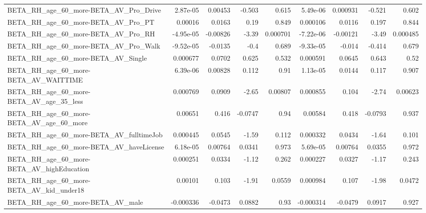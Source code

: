 \begin{tabular}{lrrrrrrrr}
BETA\_RH\_age\_60\_more-BETA\_AV\_Pro\_Drive              &    2.87e-05 &      0.00453 &    -0.503 &    0.615 &   5.49e-06 &    0.000931 &       -0.521 &         0.602 \\
BETA\_RH\_age\_60\_more-BETA\_AV\_Pro\_PT                 &     0.00016 &       0.0163 &      0.19 &    0.849 &   0.000106 &      0.0116 &        0.197 &         0.844 \\
BETA\_RH\_age\_60\_more-BETA\_AV\_Pro\_RH                 &   -4.95e-05 &     -0.00826 &     -3.39 & 0.000701 &  -7.22e-06 &    -0.00121 &        -3.49 &      0.000485 \\
BETA\_RH\_age\_60\_more-BETA\_AV\_Pro\_Walk               &   -9.52e-05 &      -0.0135 &      -0.4 &    0.689 &  -9.33e-05 &      -0.014 &       -0.414 &         0.679 \\
BETA\_RH\_age\_60\_more-BETA\_AV\_Single                 &    0.000677 &       0.0702 &     0.625 &    0.532 &   0.000591 &      0.0645 &        0.643 &          0.52 \\
BETA\_RH\_age\_60\_more-BETA\_AV\_WAITTIME               &    6.39e-06 &      0.00828 &     0.112 &     0.91 &   1.13e-05 &      0.0144 &        0.117 &         0.907 \\
BETA\_RH\_age\_60\_more-BETA\_AV\_age\_35\_less            &    0.000769 &       0.0909 &     -2.65 &  0.00807 &   0.000855 &       0.104 &        -2.74 &       0.00623 \\
BETA\_RH\_age\_60\_more-BETA\_AV\_age\_60\_more            &     0.00651 &        0.416 &   -0.0747 &     0.94 &    0.00584 &       0.418 &      -0.0793 &         0.937 \\
BETA\_RH\_age\_60\_more-BETA\_AV\_fulltimeJob            &    0.000445 &       0.0545 &     -1.59 &    0.112 &   0.000332 &      0.0434 &        -1.64 &         0.101 \\
BETA\_RH\_age\_60\_more-BETA\_AV\_haveLicense            &    6.18e-05 &      0.00764 &    0.0341 &    0.973 &   5.69e-05 &     0.00764 &       0.0355 &         0.972 \\
BETA\_RH\_age\_60\_more-BETA\_AV\_highEducation          &    0.000251 &       0.0334 &     -1.12 &    0.262 &   0.000227 &      0.0327 &        -1.17 &         0.243 \\
BETA\_RH\_age\_60\_more-BETA\_AV\_kid\_under18            &     0.00101 &        0.103 &     -1.91 &   0.0559 &   0.000984 &       0.107 &        -1.98 &        0.0472 \\
BETA\_RH\_age\_60\_more-BETA\_AV\_male                   &   -0.000336 &      -0.0473 &    0.0882 &     0.93 &  -0.000314 &     -0.0479 &       0.0917 &         0.927 \\

\end{tabular}
